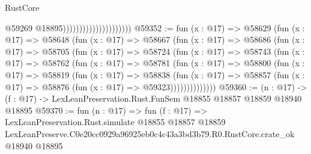 \begin{lexlean}{RustCore}
\begin{coremodule}
                                              @59269
                                              @18895)))))))))))))))))))))
@59352 := fun (x : @17) =>
  @58629
    (fun (x : @17) =>
    @58648
      (fun (x : @17) =>
      @58667
        (fun (x : @17) =>
        @58686
          (fun (x : @17) =>
          @58705
            (fun (x : @17) =>
            @58724
              (fun (x : @17) =>
              @58743
                (fun (x : @17) =>
                @58762
                  (fun (x : @17) =>
                  @58781
                    (fun (x : @17) =>
                    @58800
                      (fun (x : @17) =>
                      @58819
                        (fun (x : @17) =>
                        @58838
                          (fun (x : @17) =>
                          @58857 (fun (x : @17) => @58876 (fun (x : @17) => @59323))))))))))))))
@59360 := (n : @17) ->
  (f : @17) -> LexLeanPreservation.Rust.FunSem @18855 @18857 @18859 @18940 @18895
@59370 := fun (n : @17) =>
  fun (f : @17) =>
  LexLeanPreservation.Rust.simulate
    @18855
    @18857
    @18859
    LexLeanPreserve.C0e20cc0929a96925eb0c4c43a3bd3b79.R0.RustCore.crate_ok
    @18940
    @18895
\end{coremodule}
\end{lexlean}
